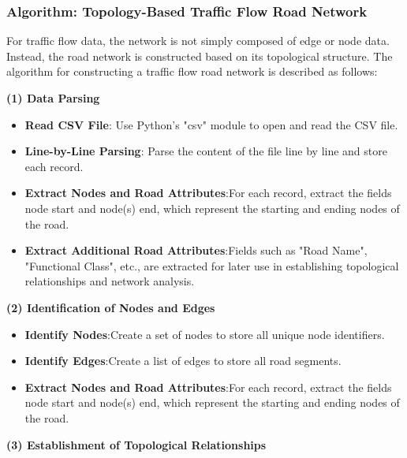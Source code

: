 \documentclass{mcmthesis}
\begin{document}
\subsubsection{Algorithm: Topology-Based Traffic Flow Road Network}

For traffic flow data, the network is not simply composed of edge or node data. Instead, the road network is constructed based on its topological structure. The algorithm for constructing a traffic flow road network is described as follows:

\textbf{(1) Data Parsing}

\begin{itemize}
    \item \textbf{Read CSV File}: Use Python's "csv" module to open and read the CSV file.  

    \item \textbf{Line-by-Line Parsing}: Parse the content of the file line by line and store each record. 

    \item \textbf{Extract Nodes and Road Attributes}:For each record, extract the fields node start and node(s) end, which represent the starting and ending nodes of the road.  

    \item \textbf{Extract Additional Road Attributes}:Fields such as "Road Name", "Functional Class", etc., are extracted for later use in establishing topological relationships and network analysis.
\end{itemize}


\textbf{(2) Identification of Nodes and Edges}

\begin{itemize}
    \item \textbf{Identify Nodes}:Create a set of nodes to store all unique node identifiers.  

    \item \textbf{Identify Edges}:Create a list of edges to store all road segments.  

    \item \textbf{Extract Nodes and Road Attributes}:For each record, extract the fields node start and node(s) end, which represent the starting and ending nodes of the road.  

\end{itemize}

\textbf{(3) Establishment of Topological Relationships}
\vspace{-5mm}
\end{document}
